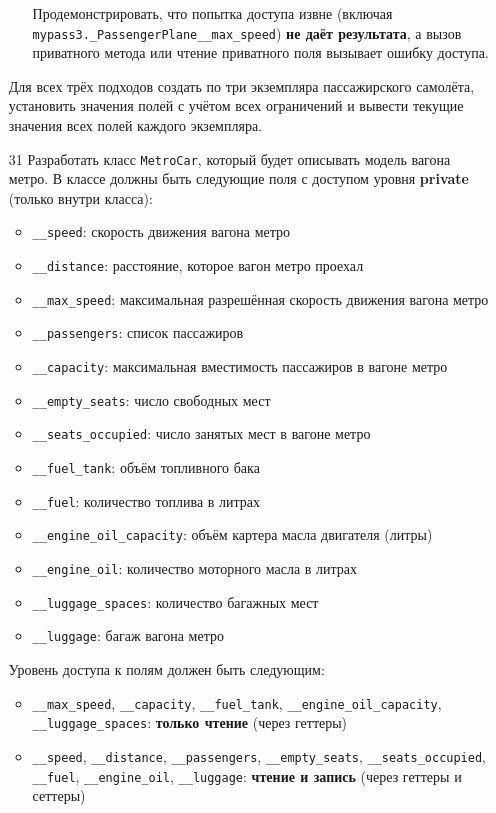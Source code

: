 \begin{enumerate}
\begin{enumerate}
    Продемонстрировать, что попытка доступа извне (включая \texttt{mypass3.\_PassengerPlane\_\_max\_speed}) \textbf{не даёт результата}, а вызов приватного метода или чтение приватного поля вызывает ошибку доступа.
\end{enumerate}
Для всех трёх подходов создать по три экземпляра пассажирского самолёта, установить значения полей с учётом всех ограничений и вывести текущие значения всех полей каждого экземпляра.
\item[31] Разработать класс \texttt{MetroCar}, который будет описывать модель вагона метро. В классе должны быть следующие поля с доступом уровня \textbf{private} (только внутри класса):
\begin{itemize}
    \item \texttt{\_\_speed}: скорость движения вагона метро  
    \item \texttt{\_\_distance}: расстояние, которое вагон метро проехал  
    \item \texttt{\_\_max\_speed}: максимальная разрешённая скорость движения вагона метро  
    \item \texttt{\_\_passengers}: список пассажиров  
    \item \texttt{\_\_capacity}: максимальная вместимость пассажиров в вагоне метро  
    \item \texttt{\_\_empty\_seats}: число свободных мест  
    \item \texttt{\_\_seats\_occupied}: число занятых мест в вагоне метро  
    \item \texttt{\_\_fuel\_tank}: объём топливного бака  
    \item \texttt{\_\_fuel}: количество топлива в литрах  
    \item \texttt{\_\_engine\_oil\_capacity}: объём картера масла двигателя (литры)  
    \item \texttt{\_\_engine\_oil}: количество моторного масла в литрах  
    \item \texttt{\_\_luggage\_spaces}: количество багажных мест  
    \item \texttt{\_\_luggage}: багаж вагона метро  
\end{itemize}
Уровень доступа к полям должен быть следующим:
\begin{itemize}
    \item \texttt{\_\_max\_speed}, \texttt{\_\_capacity}, \texttt{\_\_fuel\_tank}, \texttt{\_\_engine\_oil\_capacity}, \texttt{\_\_luggage\_spaces}: \textbf{только чтение} (через геттеры)  
    \item \texttt{\_\_speed}, \texttt{\_\_distance}, \texttt{\_\_passengers}, \texttt{\_\_empty\_seats}, \texttt{\_\_seats\_occupied}, \texttt{\_\_fuel}, \texttt{\_\_engine\_oil}, \texttt{\_\_luggage}: \textbf{чтение и запись} (через геттеры и сеттеры)

\end{itemize}
\end{enumerate}
